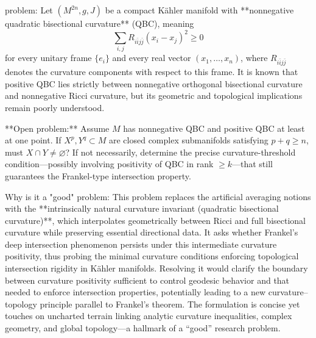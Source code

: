 problem:  
Let \((M^{2n}, g, J)\) be a compact Kähler manifold with **nonnegative quadratic bisectional curvature** (QBC), meaning  
\[
\sum_{i,j} R_{i\bar{i} j \bar{j}}(x_i - x_j)^2 \ge 0
\]
for every unitary frame \(\{e_i\}\) and every real vector \((x_1,\ldots,x_n)\), where \(R_{i\bar{i} j\bar{j}}\) denotes the curvature components with respect to this frame.  
It is known that positive QBC lies strictly between nonnegative orthogonal bisectional curvature and nonnegative Ricci curvature, but its geometric and topological implications remain poorly understood.  

**Open problem:**  
Assume \(M\) has nonnegative QBC and positive QBC at least at one point. If \(X^p, Y^q \subset M\) are closed complex submanifolds satisfying \(p+q \ge n\), must \(X \cap Y \neq \varnothing\)?  
If not necessarily, determine the precise curvature-threshold condition—possibly involving positivity of QBC in rank \( \ge k\)—that still guarantees the Frankel-type intersection property.  

Why is it a "good" problem:  
This problem replaces the artificial averaging notions with the **intrinsically natural curvature invariant (quadratic bisectional curvature)**, which interpolates geometrically between Ricci and full bisectional curvature while preserving essential directional data. It asks whether Frankel’s deep intersection phenomenon persists under this intermediate curvature positivity, thus probing the minimal curvature conditions enforcing topological intersection rigidity in Kähler manifolds. Resolving it would clarify the boundary between curvature positivity sufficient to control geodesic behavior and that needed to enforce intersection properties, potentially leading to a new curvature–topology principle parallel to Frankel’s theorem. The formulation is concise yet touches on uncharted terrain linking analytic curvature inequalities, complex geometry, and global topology—a hallmark of a “good” research problem.